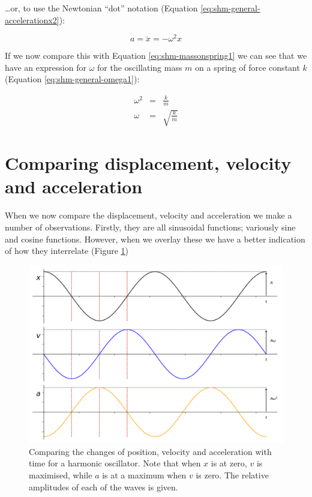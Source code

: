 \documentclass[
]{book}
\begin{document}
\ldots or, to use the Newtonian ``dot'' notation (Equation \eqref{eq:shm-general-accelerationx2}):

\begin{equation}
a = \ddot{x} = -\omega^2 x
\label{eq:shm-general-accelerationx2}
\end{equation}

If we now compare this with Equation \eqref{eq:shm-massonspring1} we can see that we have an expression for \(\omega\) for the oscillating mass \(m\) on a spring of force constant \(k\) (Equation \eqref{eq:shm-general-omega1}):

\begin{equation}
\begin{array}{rcl}
\omega^2 &=& \frac{k}{m}\\
\omega &=& \sqrt{\frac{k}{m}}
\end{array}
\label{eq:shm-general-omega1}
\end{equation}

\hypertarget{sec-shm-comparing-xva}{%
\section{Comparing displacement, velocity and acceleration}\label{sec-shm-comparing-xva}}

When we now compare the displacement, velocity and acceleration we make a number of observations. Firstly, they are all sinusoidal functions; variously sine and cosine functions. However, when we overlay these we have a better indication of how they interrelate (Figure \ref{fig:shm-general-comparison-xva})

\begin{figure}

{\centering \includegraphics[width=0.7\linewidth]{visualisations/ch1-xvacomp} 

}

\caption{Comparing the changes of position, velocity and acceleration with time for a harmonic oscillator. Note that when $x$ is at zero, $v$ is maximised, while $a$ is at a maximum when $v$ is zero. The relative amplitudes of each of the waves is given.}\label{fig:shm-general-comparison-xva}
\end{figure}
\end{document}
